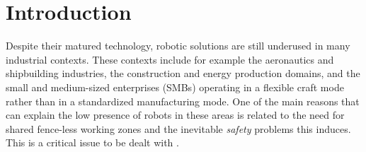 \documentclass[letterpaper, 10 pt, conference]{ieeeconf}      %
\begin{document}
\begin{abstract}
\end{abstract}





%
\IEEEpeerreviewmaketitle



\section{Introduction}
Despite their matured technology, robotic solutions are still underused in many industrial contexts. These contexts include for example the aeronautics and shipbuilding industries, the construction and energy production domains, and the small and medium-sized enterprises (SMBs) operating in a flexible craft mode rather than in a standardized manufacturing mode. One of the main reasons that can explain the low presence of robots in these areas is related to the need for shared fence-less working zones and the inevitable \textit{safety} problems this induces. This is a critical issue to be dealt with \cite{alami2006safe}. 
\end{document}
